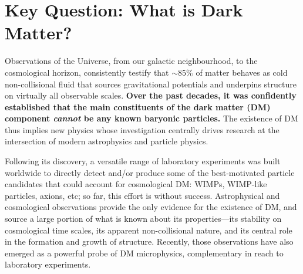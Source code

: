 \documentclass[12pt]{article}
\begin{document}
\pagebreak
\section{Key Question: What is Dark Matter?}
 
Observations of the Universe, from our galactic neighbourhood, to the cosmological horizon, consistently testify that $\sim$85$\%$ of matter behaves as cold non-collisional fluid that sources gravitational potentials and underpins structure on virtually all observable scales.
\textbf{Over the past decades, it was confidently established that the main constituents of the dark matter (DM) component \textit{cannot} be any known baryonic particles.}
The existence of DM thus implies new physics whose investigation centrally drives research at the intersection of modern astrophysics and particle physics. 

Following its discovery, a versatile range of laboratory experiments was built worldwide to directly detect and/or produce some of the best-motivated particle candidates that could account for cosmological DM: WIMPs, WIMP-like particles, axions, etc; so far, this effort is without success.
Astrophysical and cosmological observations provide the only evidence for the existence of DM, and source a large portion of what is known about its properties---its stability on cosmological time scales, its apparent non-collisional nature, and its central role in the formation and growth of structure.
Recently, those observations have also emerged as a powerful probe of DM microphysics, complementary in reach to laboratory experiments.
\end{document}
